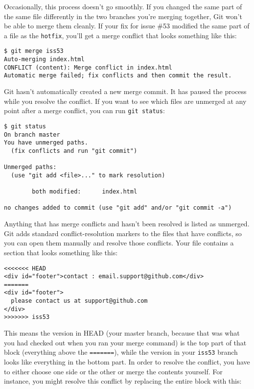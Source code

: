 \documentclass[a4paper]{book}
\begin{document}
Occasionally, this process doesn't go smoothly. If you changed the same part of the same file differently in the two branches you're merging together, Git won't be able to merge them cleanly. If your fix for issue \#53 modified the same part of a file as the \texttt{hotfix}, you'll get a merge conflict that looks something like this:

\begin{shaded}\begin{verbatim}
$ git merge iss53
Auto-merging index.html
CONFLICT (content): Merge conflict in index.html
Automatic merge failed; fix conflicts and then commit the result.
\end{verbatim}\end{shaded}

Git hasn't automatically created a new merge commit. It has paused the process while you resolve the conflict. If you want to see which files are unmerged at any point after a merge conflict, you can run \texttt{git status}:

\begin{shaded}\begin{verbatim}
$ git status
On branch master
You have unmerged paths.
  (fix conflicts and run "git commit")

Unmerged paths:
  (use "git add <file>..." to mark resolution)

        both modified:      index.html

no changes added to commit (use "git add" and/or "git commit -a")
\end{verbatim}\end{shaded}

Anything that has merge conflicts and hasn't been resolved is listed as unmerged. Git adds standard conflict-resolution markers to the files that have conflicts, so you can open them manually and resolve those conflicts. Your file contains a section that looks something like this:

\begin{shaded}\begin{verbatim}
<<<<<<< HEAD
<div id="footer">contact : email.support@github.com</div>
=======
<div id="footer">
  please contact us at support@github.com
</div>
>>>>>>> iss53
\end{verbatim}\end{shaded}

This means the version in HEAD (your master branch, because that was what you had checked out when you ran your merge command) is the top part of that block (everything above the \texttt{=======}), while the version in your \texttt{iss53} branch looks like everything in the bottom part. In order to resolve the conflict, you have to either choose one side or the other or merge the contents yourself. For instance, you might resolve this conflict by replacing the entire block with this:
\end{document}
